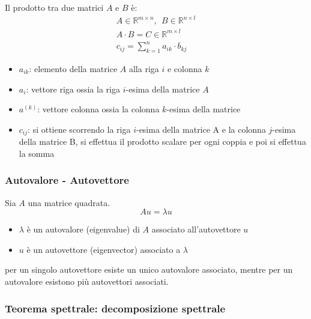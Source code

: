 	\begin{mybox}
		Il prodotto tra due matrici $A$ e $B$ è:
		\begin{gather*}
		  A\in \mathbb{R}^{m\times {n}},\ \ B\in \mathbb{R}^{{n}\times l} \\
		  A\cdot B=C\in\mathbb{R}^{m\times l} \\
		  c_{ij}=\sum_{{k}=1}^{{n}}a_{i{k}}\cdot b_{{k}j}
		\end{gather*}
		\begin{itemize}[itemsep=3pt, topsep=3pt]
			\item $a_{ik}$: elemento della matrice $A$ alla riga $i$ e colonna $k$
			\item $a_i$: vettore riga ossia la riga $i$-esima della matrice $A$
			\item $a^{(k)}$: vettore colonna ossia la colonna $k$-esima della matrice
			\item $c_{ij}$: si ottiene scorrendo la riga $i$-esima della matrice A e la colonna $j$-esima della matrice B, si effettua il prodotto scalare per ogni coppia e poi si effettua la somma
		\end{itemize}
	\end{mybox}
	
	
	\subsubsection{Autovalore - Autovettore}
	\begin{mybox}
		Sia $A$ una matrice quadrata.
		$$
		Au=\lambda u
		$$
		
		\begin{itemize}[itemsep=3pt, topsep=3pt]
		  \item $\lambda$ è un autovalore (eigenvalue) di $A$ associato all’autovettore $u$
		  \item $u$ è un autovettore (eigenvector) associato a $\lambda$
		\end{itemize}
		
		per un singolo autovettore esiste un unico autovalore associato, mentre per un autovalore esistono più autovettori associati.
	
	\end{mybox}
	
	\subsubsection{Teorema spettrale: decomposizione spettrale}
	
